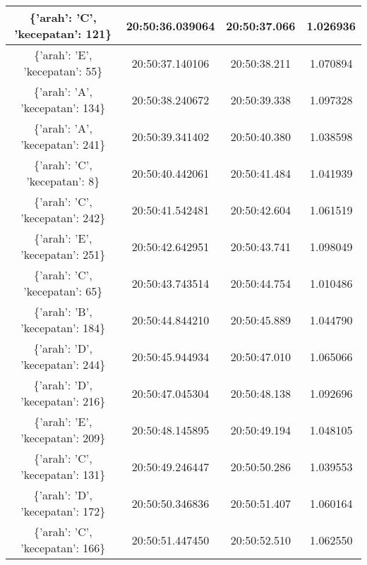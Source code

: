 \begin{longtable}{|ccc|c|}
    \multicolumn{1}{|c|}{\{'arah': 'C', 'kecepatan': 121\}} & \multicolumn{1}{c|}{20:50:36.039064} & 20:50:37.066       & 1.026936    \\ \hline
    \multicolumn{1}{|c|}{\{'arah': 'E', 'kecepatan': 55\}}  & \multicolumn{1}{c|}{20:50:37.140106} & 20:50:38.211       & 1.070894    \\ \hline
    \multicolumn{1}{|c|}{\{'arah': 'A', 'kecepatan': 134\}} & \multicolumn{1}{c|}{20:50:38.240672} & 20:50:39.338       & 1.097328    \\ \hline
    \multicolumn{1}{|c|}{\{'arah': 'A', 'kecepatan': 241\}} & \multicolumn{1}{c|}{20:50:39.341402} & 20:50:40.380       & 1.038598    \\ \hline
    \multicolumn{1}{|c|}{\{'arah': 'C', 'kecepatan': 8\}}   & \multicolumn{1}{c|}{20:50:40.442061} & 20:50:41.484       & 1.041939    \\ \hline
    \multicolumn{1}{|c|}{\{'arah': 'C', 'kecepatan': 242\}} & \multicolumn{1}{c|}{20:50:41.542481} & 20:50:42.604       & 1.061519    \\ \hline
    \multicolumn{1}{|c|}{\{'arah': 'E', 'kecepatan': 251\}} & \multicolumn{1}{c|}{20:50:42.642951} & 20:50:43.741       & 1.098049    \\ \hline
    \multicolumn{1}{|c|}{\{'arah': 'C', 'kecepatan': 65\}}  & \multicolumn{1}{c|}{20:50:43.743514} & 20:50:44.754       & 1.010486    \\ \hline
    \multicolumn{1}{|c|}{\{'arah': 'B', 'kecepatan': 184\}} & \multicolumn{1}{c|}{20:50:44.844210} & 20:50:45.889       & 1.044790    \\ \hline
    \multicolumn{1}{|c|}{\{'arah': 'D', 'kecepatan': 244\}} & \multicolumn{1}{c|}{20:50:45.944934} & 20:50:47.010       & 1.065066    \\ \hline
    \multicolumn{1}{|c|}{\{'arah': 'D', 'kecepatan': 216\}} & \multicolumn{1}{c|}{20:50:47.045304} & 20:50:48.138       & 1.092696    \\ \hline
    \multicolumn{1}{|c|}{\{'arah': 'E', 'kecepatan': 209\}} & \multicolumn{1}{c|}{20:50:48.145895} & 20:50:49.194       & 1.048105    \\ \hline
    \multicolumn{1}{|c|}{\{'arah': 'C', 'kecepatan': 131\}} & \multicolumn{1}{c|}{20:50:49.246447} & 20:50:50.286       & 1.039553    \\ \hline
    \multicolumn{1}{|c|}{\{'arah': 'D', 'kecepatan': 172\}} & \multicolumn{1}{c|}{20:50:50.346836} & 20:50:51.407       & 1.060164    \\ \hline
    \multicolumn{1}{|c|}{\{'arah': 'C', 'kecepatan': 166\}} & \multicolumn{1}{c|}{20:50:51.447450} & 20:50:52.510       & 1.062550    \\ \hline

\end{longtable}
